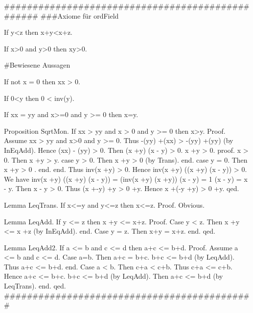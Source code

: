 \documentclass{article}
\newenvironment{forthel}{\begin{leftbar}}{\end{leftbar}}
\newtheorem{axiom}{\begin{axiom} }
\newcommand{\rmul}{\cdot}
\newcommand{\radd}{+}
\begin{document}
\begin{forthel}
#################################################
###Axiome für ordField
\begin{axiom}[InEqAdd] If y<z then x\radd y<x\radd z.
\end{axiom}
\begin{axiom}[InEqMult] If x>0 and y>0 then x\rmul y>0.
\end{axiom}

#Bewiesene Aussagen
\begin{axiom}[P118d] If not x = 0 then x\rmul x > 0.
\end{axiom}
\begin{axiom}[P118e1] If 0<y then 0 < inv(y).
\end{axiom}

\begin{axiom}[SqrtEind] If x\rmul x = y\rmul y and x>=0 and y >= 0 then x=y.
\end{axiom}

Proposition SqrtMon. If x\rmul x > y\rmul y and x > 0  and y >= 0 then x>y.
Proof.	Assume x\rmul x > y\rmul y and x>0 and y >= 0.
		Thus  -(y\rmul y) \radd  (x\rmul x) > -(y\rmul y) \radd  (y\rmul y) (by InEqAdd). 
		Hence (x\rmul x) - (y\rmul y) > 0.
		Then  (x \radd  y) \rmul  (x - y) > 0.
		x \radd  y > 0.
		proof. 	x > 0. Then x \radd  y > y.
				case y > 0. Then x \radd  y > 0 (by Trans). end.
				case y = 0. Then x \radd  y  > 0 . end.
		end.
		Thus inv(x \radd  y) > 0. Hence inv(x \radd  y) \rmul  ((x \radd  y) \rmul  (x - y)) > 0.
		We have inv(x \radd  y) \rmul  ((x \radd  y) \rmul  (x - y)) 
			 = (inv(x \radd  y) \rmul  (x \radd  y)) \rmul  (x - y)
			 = 1 \rmul  (x - y) = x - y.
		Then x - y > 0.
		Thus (x \radd  -y) \radd  y > 0 \radd  y.
		Hence x \radd  (-y \radd  y) > 0 \radd  y.
qed.

Lemma LeqTrans. If x<=y and y<=z then x<=z.
Proof. 	Obvious.


Lemma LeqAdd. 	If y <= z then x \radd  y <= x\radd z.
Proof.			Case y < z. Then x \radd  y <= x \radd  z (by InEqAdd). end.
				Case y = z. Then x\radd y = x\radd z. end.
qed.

Lemma LeqAdd2.  If a <= b and c <= d then a\radd c <= b\radd d.
Proof.			Assume a <= b and c <= d. 
				Case a=b. Then a\radd c = b\radd c. b\radd c <= b\radd d (by LeqAdd). Thus a\radd c <= b\radd d. end.
				Case a < b. Then c\radd a < c\radd b. Thus c\radd a <= c\radd b. Hence a\radd c <= b\radd c. b\radd c <= b\radd d (by LeqAdd).
							Then a\radd c <= b\radd d (by LeqTrans). end.
qed.
############################################


\end{forthel}
\end{document}
